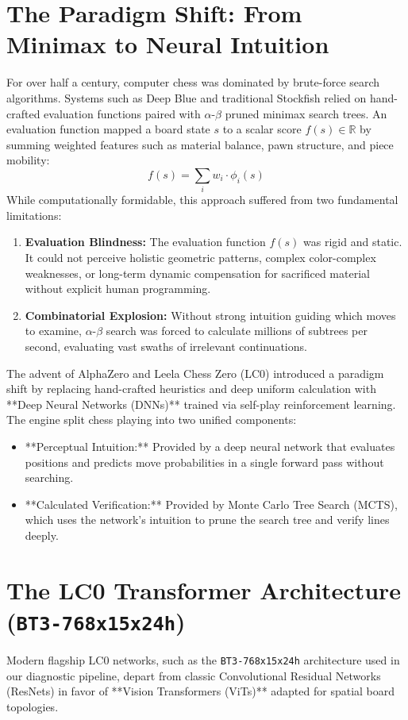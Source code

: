 \documentclass[11pt,a4paper]{report}
\begin{document}
\section{The Paradigm Shift: From Minimax to Neural Intuition}
For over half a century, computer chess was dominated by brute-force search algorithms. Systems such as Deep Blue and traditional Stockfish relied on hand-crafted evaluation functions paired with $\alpha$-$\beta$ pruned minimax search trees. An evaluation function mapped a board state $s$ to a scalar score $f(s) \in \mathbb{R}$ by summing weighted features such as material balance, pawn structure, and piece mobility:
\begin{equation}
f(s) = \sum_{i} w_i \cdot \phi_i(s)
\end{equation}
While computationally formidable, this approach suffered from two fundamental limitations:
\begin{enumerate}
    \item \textbf{Evaluation Blindness:} The evaluation function $f(s)$ was rigid and static. It could not perceive holistic geometric patterns, complex color-complex weaknesses, or long-term dynamic compensation for sacrificed material without explicit human programming.
    \item \textbf{Combinatorial Explosion:} Without strong intuition guiding which moves to examine, $\alpha$-$\beta$ search was forced to calculate millions of subtrees per second, evaluating vast swaths of irrelevant continuations.
\end{enumerate}

The advent of AlphaZero and Leela Chess Zero (LC0) introduced a paradigm shift by replacing hand-crafted heuristics and deep uniform calculation with **Deep Neural Networks (DNNs)** trained via self-play reinforcement learning. The engine split chess playing into two unified components:
\begin{itemize}
    \item **Perceptual Intuition:** Provided by a deep neural network that evaluates positions and predicts move probabilities in a single forward pass without searching.
    \item **Calculated Verification:** Provided by Monte Carlo Tree Search (MCTS), which uses the network's intuition to prune the search tree and verify lines deeply.
\end{itemize}

\section{The LC0 Transformer Architecture (\texttt{BT3-768x15x24h})}
Modern flagship LC0 networks, such as the \texttt{BT3-768x15x24h} architecture used in our diagnostic pipeline, depart from classic Convolutional Residual Networks (ResNets) in favor of **Vision Transformers (ViTs)** adapted for spatial board topologies.
\end{document}
